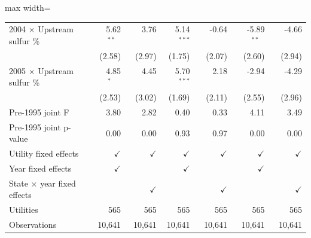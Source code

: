 \begin{table}[htbp]
{\begin{adjustbox}{max width=\linewidth}
\begin{tabular}{lrrrrrr}
2004 $\times$ Upstream sulfur \% & \phantom{(}\phantom{-}5.62$^{**\phantom{*}}$ & \phantom{(}\phantom{-}3.76$^{\phantom{*}\phantom{*}\phantom{*}}$ & \phantom{(}\phantom{-}5.14$^{***}$ & \phantom{(}-0.64$^{\phantom{*}\phantom{*}\phantom{*}}$ & \phantom{(}-5.89$^{**\phantom{*}}$ & \phantom{(}-4.66$^{\phantom{*}\phantom{*}\phantom{*}}$ \\
 & (\phantom{-}2.58)\phantom{$^{***}$} & (\phantom{-}2.97)\phantom{$^{***}$} & (\phantom{-}1.75)\phantom{$^{***}$} & (\phantom{-}2.07)\phantom{$^{***}$} & (\phantom{-}2.60)\phantom{$^{***}$} & (\phantom{-}2.94)\phantom{$^{***}$} \\
2005 $\times$ Upstream sulfur \% & \phantom{(}\phantom{-}4.85$^{*\phantom{*}\phantom{*}}$ & \phantom{(}\phantom{-}4.45$^{\phantom{*}\phantom{*}\phantom{*}}$ & \phantom{(}\phantom{-}5.70$^{***}$ & \phantom{(}\phantom{-}2.18$^{\phantom{*}\phantom{*}\phantom{*}}$ & \phantom{(}-2.94$^{\phantom{*}\phantom{*}\phantom{*}}$ & \phantom{(}-4.29$^{\phantom{*}\phantom{*}\phantom{*}}$ \\
 & (\phantom{-}2.53)\phantom{$^{***}$} & (\phantom{-}3.02)\phantom{$^{***}$} & (\phantom{-}1.69)\phantom{$^{***}$} & (\phantom{-}2.11)\phantom{$^{***}$} & (\phantom{-}2.55)\phantom{$^{***}$} & (\phantom{-}2.96)\phantom{$^{***}$} \\
\hline
Pre-1995 joint F & 3.80 & 2.82 & 0.40 & 0.33 & 4.11 & 3.49 \\
Pre-1995 joint p-value & 0.00 & 0.00 & 0.93 & 0.97 & 0.00 & 0.00 \\
Utility fixed effects & $\checkmark$ & $\checkmark$ & $\checkmark$ & $\checkmark$ & $\checkmark$ & $\checkmark$ \\
Year fixed effects & $\checkmark$ &  & $\checkmark$ &  & $\checkmark$ &  \\
State $\times$ year fixed effects &  & $\checkmark$ &  & $\checkmark$ &  & $\checkmark$ \\
Utilities & 565 & 565 & 565 & 565 & 565 & 565 \\
Observations & 10,641 & 10,641 & 10,641 & 10,641 & 10,641 & 10,641 \\
\bottomrule
\end{tabular}
\end{adjustbox}
}
\begin{minipage}{\linewidth}
\vspace{4pt}
\footnotesize
\raggedright

\end{minipage}
\end{table}
